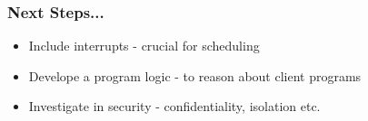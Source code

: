 \documentclass{beamer}
\begin{document}
\begin{frame}
  \frametitle{Next Steps...}
  \begin{itemize}
    \item Include interrupts - crucial for scheduling
    \item Develope a program logic - to reason about client programs
    \item Investigate in security - confidentiality, isolation etc.
  \end{itemize}
\end{frame}
\end{document}
